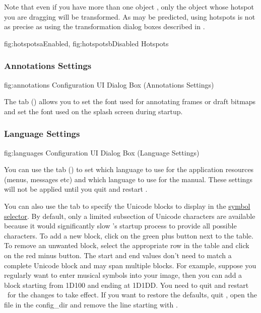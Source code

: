 Note that even if you have more than one \gls{object} \selected, only the
object whose \gls{hotspot} you are dragging will be transformed.
As may be predicted, using \glspl{hotspot} is not as precise as using the
transformation dialog boxes described in
.

{
 {fig:hotspotsa}{}{Enabled},
 {fig:hotspotsb}{}{Disabled}
}
{Hotspots}


\subsubsection{Annotations Settings}\label{sec:annotations}


\FloatFig
  {fig:annotations}
  {}
  {Configuration UI Dialog Box (Annotations Settings)}

The  tab ()
allows you to set the font used for annotating frames or draft
\glspl{bitmap} and set the font used on the splash screen during startup.


\subsubsection{Language Settings}\label{sec:languages}


\FloatFig
  {fig:languages}
  {}
  {Configuration UI Dialog Box (Language Settings)}

You can use the  tab
()
to set which language to use for the application
resources (menus, messages etc) and which language to use for
the manual. These settings will not be applied until you quit and
restart \FlowframTk.

You can also use the  tab to specify the
Unicode blocks to display in the
\hyperref[mi:insertsymbol]{symbol selector}. By default, only
a limited subsection of Unicode characters are available because it
would significantly slow \FlowframTk's startup process to provide
all possible characters. To add a new block, \gls{click} on the
green plus button next to the table. To remove an unwanted block,
select the appropriate row in the table and \gls{click} on the red minus
button. The start and end values don't need to match a complete
Unicode block and may span multiple blocks. For example, suppose you
regularly want to enter musical symbols into your image, then you
can add a block starting from 1D100 and ending at 1D1DD. You need to
quit and restart \FlowframTk\ for the changes to take effect. If you
want to restore the defaults, quit \FlowframTk, open the file
 in the \gls{config_dir} and remove
the line starting with .

